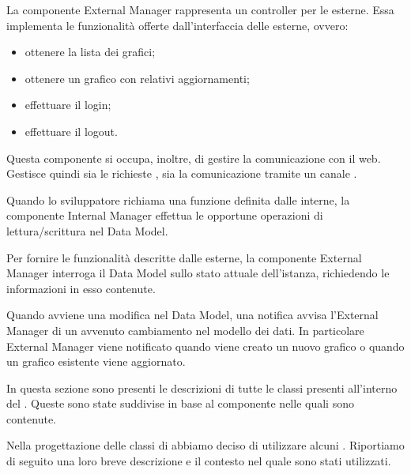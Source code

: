 			La componente External  Manager rappresenta un controller per le  esterne. Essa implementa le funzionalità offerte dall'interfaccia delle  esterne, ovvero:
			\begin{itemize}
				\item ottenere la lista dei grafici;
				\item ottenere un grafico con relativi aggiornamenti;
				\item effettuare il login;
				\item effettuare il logout.
			\end{itemize}
		Questa componente si occupa, inoltre, di gestire la comunicazione con il  web. Gestisce quindi sia le richieste , sia la comunicazione tramite un canale .


			Quando lo sviluppatore richiama una funzione definita dalle  interne, la componente Internal  Manager effettua le opportune operazioni di lettura/scrittura nel Data Model.

			Per fornire le funzionalità descritte dalle  esterne, la componente External  Manager interroga il Data Model sullo stato attuale dell'istanza, richiedendo le informazioni in esso contenute.

			Quando avviene una modifica nel Data Model, una notifica avvisa l'External  Manager di un avvenuto cambiamento nel modello dei dati. In particolare External  Manager viene notificato quando viene creato un nuovo grafico o quando un grafico esistente viene aggiornato.

		In questa sezione sono presenti le descrizioni di tutte le classi presenti all'interno del  . Queste sono state suddivise in base al componente nelle quali sono contenute.
		
		
	
		Nella progettazione delle classi di  abbiamo deciso di utilizzare alcuni . Riportiamo di seguito una loro breve descrizione e il contesto nel quale sono stati utilizzati.
		
